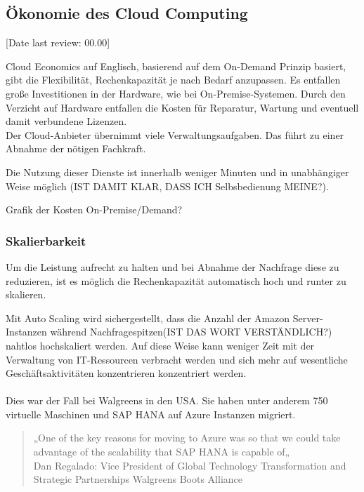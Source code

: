\subsection{Ökonomie des Cloud Computing}\label{subsec_UabsGrund3}
[Date last review: 00.00]
\begin{flushleft}
      {
            Cloud Economics auf Englisch, basierend auf dem On-Demand Prinzip basiert,
            gibt die Flexibilität, Rechenkapazität je nach Bedarf anzupassen.
            Es entfallen große Investitionen in der Hardware, wie bei On-Premise-Systemen.
            Durch den Verzicht auf Hardware entfallen die Kosten für Reparatur, Wartung und eventuell damit verbundene Lizenzen. 
            \\
            Der Cloud-Anbieter übernimmt viele Verwaltungsaufgaben. Das führt zu einer Abnahme der nötigen Fachkraft.
            {\cite{IDC01}}


            Die Nutzung dieser Dienste ist innerhalb weniger Minuten und in unabhängiger Weise möglich 
            (IST DAMIT KLAR, DASS ICH Selbsbedienung MEINE?). }
\end{flushleft}

Grafik der Kosten On-Premise/Demand?

\subsubsection{Skalierbarkeit}
Um die Leistung aufrecht zu halten und bei Abnahme der Nachfrage diese zu reduzieren,  ist es möglich die Rechenkapazität automatisch hoch und runter zu skalieren.

Mit Auto Scaling wird sichergestellt, dass die Anzahl der Amazon Server-Instanzen während
Nachfragespitzen(IST DAS WORT VERSTÄNDLICH?) nahtlos hochskaliert werden.
Auf diese Weise kann weniger Zeit mit der Verwaltung von IT-Ressourcen verbracht werden und sich mehr auf wesentliche Geschäftsaktivitäten konzentrieren konzentriert werden.
\\\\
Dies war der Fall bei Walgreens in den USA.
Sie haben unter anderem 750 virtuelle Maschinen und SAP HANA auf Azure Instanzen migriert.

\begin{quote}
      „One of the key reasons for moving to Azure was so that we could take advantage of the scalability that SAP HANA is capable of„
      \\
      Dan Regalado: Vice President of Global Technology Transformation and Strategic Partnerships Walgreens Boots Alliance
            {\cite{AZU01}}
\end{quote}

